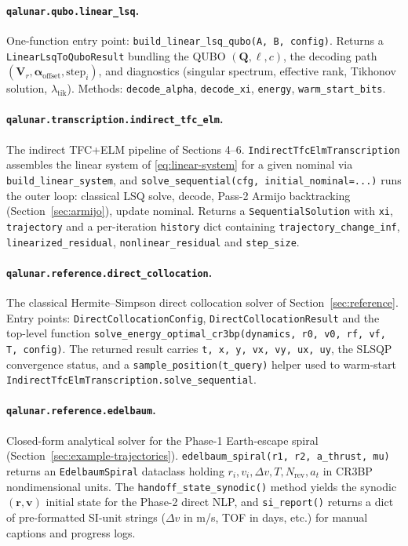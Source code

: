 \documentclass[8pt,a4paper]{article}
\newcommand{\bvec}[1]{\bm{#1}}
\newcommand{\Qmat}{\bvec{Q}}
\newcommand{\Vr}{\bvec{V}_r}
\theoremstyle{definition}
\theoremstyle{remark}
\begin{document}
\paragraph{\texttt{qalunar.qubo.linear\_lsq}.}
One-function entry point:
\texttt{build\_linear\_lsq\_qubo(A, B, config)}. Returns a
\texttt{LinearLsqToQuboResult} bundling the QUBO
$(\Qmat, \bvec\ell, c)$, the decoding path $(\Vr,
\bm\alpha_{\mathrm{offset}}, \text{step}_i)$, and diagnostics
(singular spectrum, effective rank, Tikhonov solution,
$\lambda_{\mathrm{tik}}$). Methods:
\texttt{decode\_alpha}, \texttt{decode\_xi}, \texttt{energy},
\texttt{warm\_start\_bits}.

\paragraph{\texttt{qalunar.transcription.indirect\_tfc\_elm}.}
The indirect TFC+ELM pipeline of Sections 4--6.
\texttt{IndirectTfcElmTranscription} assembles the linear system of
\eqref{eq:linear-system} for a given nominal via
\texttt{build\_linear\_system}, and
\texttt{solve\_sequential(cfg, initial\_nominal=...)} runs the outer
loop: classical LSQ solve, decode, Pass-2 Armijo backtracking
(Section~\ref{sec:armijo}), update nominal. Returns a
\texttt{SequentialSolution} with \texttt{xi}, \texttt{trajectory} and
a per-iteration \texttt{history} dict containing
\texttt{trajectory\_change\_inf}, \texttt{linearized\_residual},
\texttt{nonlinear\_residual} and \texttt{step\_size}.

\paragraph{\texttt{qalunar.reference.direct\_collocation}.}
The classical Hermite--Simpson direct collocation solver of
Section~\ref{sec:reference}. Entry points:
\texttt{DirectCollocationConfig}, \texttt{DirectCollocationResult}
and the top-level function
\texttt{solve\_energy\_optimal\_cr3bp(dynamics, r0, v0, rf, vf, T,
config)}. The returned result carries \texttt{t, x, y, vx, vy, ux, uy},
the SLSQP convergence status, and a \texttt{sample\_position(t\_query)}
helper used to warm-start
\texttt{IndirectTfcElmTranscription.solve\_sequential}.

\paragraph{\texttt{qalunar.reference.edelbaum}.}
Closed-form analytical solver for the Phase-1 Earth-escape spiral
(Section~\ref{sec:example-trajectories}).
\texttt{edelbaum\_spiral(r1, r2, a\_thrust, mu)} returns an
\texttt{EdelbaumSpiral} dataclass holding $r_i, v_i, \Delta v, T,
N_{\mathrm{rev}}, a_t$ in CR3BP nondimensional units. The
\texttt{handoff\_state\_synodic()} method yields the synodic
$(\bvec r, \bvec v)$ initial state for the Phase-2 direct NLP, and
\texttt{si\_report()} returns a dict of pre-formatted SI-unit strings
($\Delta v$ in m/s, TOF in days, etc.) for manual captions and
progress logs.
\end{document}

